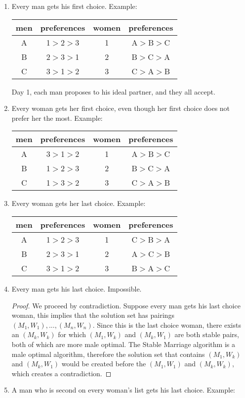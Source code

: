 \documentclass[11pt, notitlepage]{report}
\begin{document}
\begin{enumerate}[label=(\alph*)]
	\item Every man gets his first choice. Example: \hfill
	
	\begin{center}
	\begin{tabular}{|c|c||c|c|}\hline
	men&preferences&women & preferences \\
	\hline
	A&1$>$2$>$3		&1& A$>$B$>$C \\
	\hline
	B&2$>$3$>$1     &2& B$>$C$>$A  \\
	\hline
	C&3$>$1$>$2     &3& C$>$A$>$B  \\
	\hline
	\end{tabular}
	\end{center}
	
	Day 1, each man proposes to his ideal partner, and they all accept.
    
    \item Every woman gets her first choice, even though her first choice does not prefer her the most. Example:
	\begin{center}
	\begin{tabular}{|c|c||c|c|}\hline
	men&preferences&women & preferences \\
	\hline
	A&3$>$1$>$2		&1& A$>$B$>$C \\
	\hline
	B&1$>$2$>$3     &2& B$>$C$>$A  \\
	\hline
	C&1$>$3$>$2     &3& C$>$A$>$B  \\
	\hline
	\end{tabular}
	\end{center}
	
    \item Every woman gets her last choice. Example: \hfill
	
	\begin{center}
	\begin{tabular}{|c|c||c|c|}\hline
	men&preferences&women & preferences \\
	\hline
	A&1$>$2$>$3		&1& C$>$B$>$A \\
	\hline
	B&2$>$3$>$1     &2& A$>$C$>$B  \\
	\hline
	C&3$>$1$>$2     &3& B$>$A$>$C  \\
	\hline
	\end{tabular}
	\end{center}
    \item Every man gets his last choice. Impossible.
    \begin{proof}
    	We proceed by contradiction. Suppose every man gets his last choice woman, this implies that the solution set has pairings $(M_1,W_1),...,(M_n,W_n)$. Since this is the last choice woman, there exists an $(M_k,W_k)$ for which $(M_1,W_k)$ and $(M_k,W_1)$ are both stable pairs, both of which are more male optimal. The Stable Marriage algorithm is a male optimal algorithm, therefore the solution set that contains $(M_1,W_k)$ and $(M_k,W_1)$ would be created before the $(M_1,W_1)$ and $(M_k,W_k)$, which creates a contradiction.
    \end{proof}
    \item A man who is second on every woman's list gets his last choice.  Example: \hfill
	

\end{enumerate}
\end{document}
